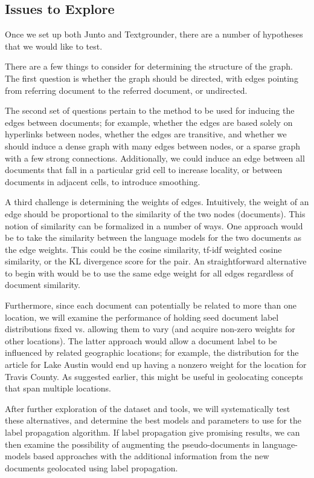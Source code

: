 \subsection{Issues to Explore}
Once we set up both Junto and Textgrounder, there are a number of hypotheses that we would like to test.

There are a few things to consider for determining the structure of the graph.
The first question is whether the graph should be directed, with edges pointing from referring document to the referred document, or undirected. 

The second set of questions pertain to the method to be used for inducing the edges between documents;
for example, whether the edges are based solely on hyperlinks between nodes, whether the edges are transitive, and whether we should induce a dense graph with many edges between nodes, or a sparse graph with a few strong connections.
Additionally, we could induce an edge between all documents that fall in a particular grid cell to increase locality, or between documents in adjacent cells, to introduce smoothing.

A third challenge is determining the weights of edges.
Intuitively, the weight of an edge should be proportional to the similarity of the two nodes (documents).
This notion of similarity can be formalized in a number of ways.
One approach would be to take the similarity between the language models for the two documents as the edge weights.
This could be the cosine similarity, tf-idf weighted cosine similarity, or the KL divergence score for the pair.
An straightforward alternative to begin with would be to use the same edge weight for all edges regardless of document similarity.
 
Furthermore, since each document can potentially be related to more than one location, we will examine the performance of holding seed document label distributions fixed vs. allowing them to vary (and acquire non-zero weights for other locations).
The latter approach would allow a document label to be influenced by related geographic locations; 
for example, the distribution for the article for Lake Austin would end up having a nonzero weight for the location for Travis County.
As suggested earlier, this might be useful in geolocating concepts that span multiple locations.

After further exploration of the dataset and tools, we will systematically test these alternatives, and determine the best models and parameters to use for the label propagation algorithm.
If label propagation give promising results, we can then examine the possibility of augmenting the pseudo-documents in language-models based approaches with the additional information from the new documents geolocated using label propagation.

